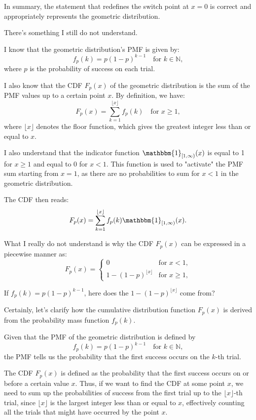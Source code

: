 \documentclass[12pt]{article}
\begin{document}
In summary, the statement that redefines the switch point at \( x = 0 \) is correct and appropriately represents the geometric distribution.


\newpage

There's something I still do not understand. 

I know that the geometric distribution's PMF is given by:
\[
f_{p}(k) = p(1-p)^{k-1} \quad \text{for } k \in \mathbb{N},
\]
where \( p \) is the probability of success on each trial.

I also know that the CDF \( F_{p}(x) \) of the geometric distribution is the sum of the PMF values up to a certain point \( x \). By definition, we have:
\[
F_p(x) = \sum_{k=1}^{\lfloor x \rfloor} f_p(k) \quad \text{for } x \geq 1,
\]
where \( \lfloor x \rfloor \) denotes the floor function, which gives the greatest integer less than or equal to \( x \).

I also understand that the indicator function \( \mathbbm{1}_{[1, \infty)}(x) \) is equal to 1 for \( x \geq 1 \) and equal to 0 for \( x < 1 \). This function is used to "activate" the PMF sum starting from \( x = 1 \), as there are no probabilities to sum for \( x < 1 \) in the geometric distribution.

The CDF then reads:
\[
F_p(x)=\sum_{k=1}^{\lfloor x \rfloor} f_p(k) \mathbbm{1}_{[1, \infty)}(x).
\]


What I really do not understand is why the CDF \( F_{p}(x) \) can be expressed in a piecewise manner as:
\[
F_p(x) = 
\begin{cases}
0 & \text{for } x < 1, \\
1 - (1 - p)^{\lfloor x \rfloor} & \text{for } x \geq 1,
\end{cases}
\]



If $f_{p}(k) = p(1-p)^{k-1}$,  here does the $1 - (1 - p)^{\lfloor x \rfloor}$ come from?


\newpage

Certainly, let's clarify how the cumulative distribution function \( F_p(x) \) is derived from the probability mass function \( f_p(k) \).

Given that the PMF of the geometric distribution is defined by
\[
f_p(k) = p(1-p)^{k-1} \quad \text{for } k \in \mathbb{N},
\]
the PMF tells us the probability that the first success occurs on the \( k \)-th trial.

The CDF \( F_p(x) \) is defined as the probability that the first success occurs on or before a certain value \( x \). Thus, if we want to find the CDF at some point \( x \), we need to sum up the probabilities of success from the first trial up to the \( \lfloor x \rfloor \)-th trial, since \( \lfloor x \rfloor \) is the largest integer less than or equal to \( x \), effectively counting all the trials that might have occurred by the point \( x \).
\end{document}
